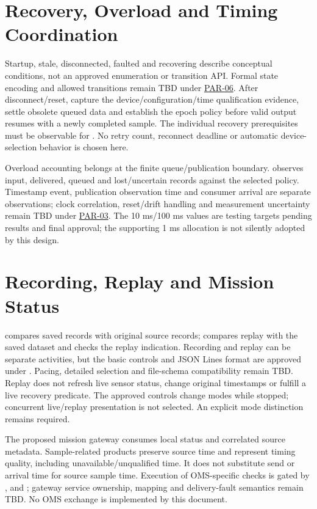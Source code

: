 \section{Recovery, Overload and Timing Coordination}
Startup, stale, disconnected, faulted and recovering describe conceptual
conditions, not an approved enumeration or transition API. Formal state
encoding and allowed transitions remain TBD under
\hyperref[Parameter:PAR-06]{PAR-06}. After disconnect/reset, capture the
device/configuration/time qualification evidence, settle obsolete queued data
and establish the epoch policy before valid output resumes with a newly
completed sample. The individual recovery prerequisites must be observable
for . No retry count, reconnect deadline or automatic
device-selection behavior is chosen here.

Overload accounting belongs at the finite queue/publication boundary.
 observes input, delivered, queued and lost/uncertain
records against the selected policy. Timestamp event, publication observation
time and consumer arrival are separate observations; clock correlation,
reset/drift handling and measurement uncertainty remain TBD under
\hyperref[Parameter:PAR-03]{PAR-03}. The 10 ms/100 ms values are testing
targets pending results and final approval; the supporting 1 ms allocation
is not silently adopted by this design.

\section{Recording, Replay and Mission Status}
 compares saved records with original source records;
 compares replay with the saved dataset and checks the
replay indication. Recording and replay can be separate activities, but the basic controls and JSON Lines format are approved under . Pacing, detailed selection and file-schema compatibility remain TBD. Replay does not
refresh live sensor status, change original timestamps or fulfill a live
recovery predicate. The approved controls change modes while stopped; concurrent live/replay presentation is not selected. An explicit mode distinction remains required.

The proposed mission gateway consumes local status and correlated source
metadata. Sample-related products preserve source time and represent timing
quality, including unavailable/unqualified time. It does not substitute send
or arrival time for source sample time. Execution of OMS-specific checks is
gated by ,  and
; gateway service ownership, mapping and delivery-fault
semantics remain TBD. No OMS exchange is implemented by this document.

